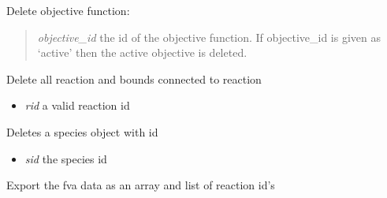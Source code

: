 \documentclass[a4paper,11pt,english]{sphinxmanual}
\begin{document}
\begin{fulllineitems}
\begin{fulllineitems}
\begin{itemize}
\end{itemize}

\end{fulllineitems}


\begin{fulllineitems}
\label{modules_doc:cbmpy.CBModel.Model.deleteObjective}
Delete objective function:
\begin{quote}

\emph{objective\_id} the id of the objective function. If objective\_id is given  as `active' then the active objective is deleted.
\end{quote}

\end{fulllineitems}


\begin{fulllineitems}
\label{modules_doc:cbmpy.CBModel.Model.deleteReactionAndBounds}
Delete all reaction and bounds connected to reaction
\begin{itemize}
\item {} 
\emph{rid} a valid reaction id

\end{itemize}

\end{fulllineitems}


\begin{fulllineitems}
\label{modules_doc:cbmpy.CBModel.Model.deleteSpecies}
Deletes a species object with id
\begin{itemize}
\item {} 
\emph{sid} the species id

\end{itemize}

\end{fulllineitems}


\begin{fulllineitems}
\label{modules_doc:cbmpy.CBModel.Model.exportFVAdata}
Export the fva data as an array and list of reaction id's


\end{fulllineitems}
\end{fulllineitems}
\end{document}
